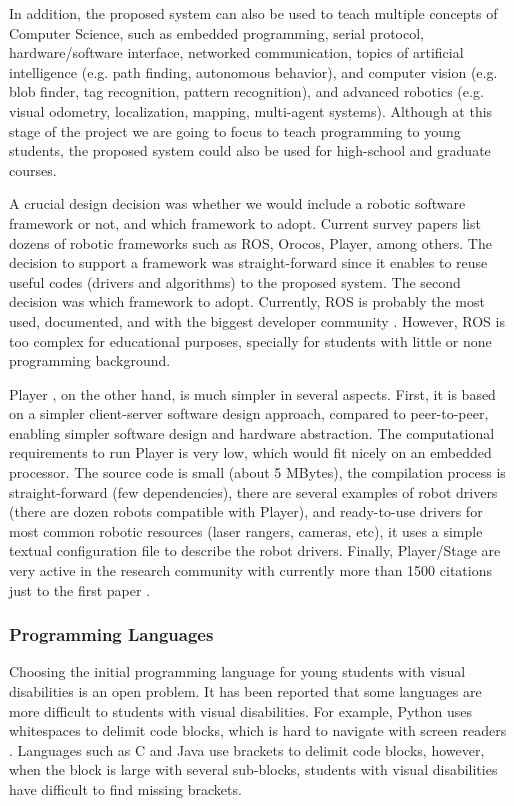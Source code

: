 In addition, the proposed system can also be used to teach multiple concepts of Computer Science, such as embedded programming, serial protocol, hardware/software interface, networked communication, topics of artificial intelligence (e.g. path finding, autonomous behavior), and computer vision (e.g. blob finder, tag recognition, pattern recognition), and advanced robotics (e.g. visual odometry, localization, mapping, multi-agent systems). Although at this stage of the project we are going to focus to teach programming to young students, the proposed system could also be used for high-school and graduate courses.

A crucial design decision was whether we would include a robotic software framework or not, and which framework to adopt. Current survey papers \cite{kramer2007,elkady2012} list dozens of robotic frameworks such as ROS, Orocos, Player, among others. The decision to support a framework was straight-forward since it enables to reuse useful codes (drivers and algorithms) to the proposed system. The second decision was which framework to adopt. Currently, ROS is probably the most used, documented, and with the biggest developer community \cite{quigley2009}. However, ROS is too complex for educational purposes, specially for students with little or none programming background. 

Player \cite{gerkey2003}, on the other hand, is much simpler in several aspects. First, it is based on a simpler client-server software design approach, compared to peer-to-peer, enabling simpler software design and hardware abstraction. The computational requirements to run Player is very low, which would fit nicely on an embedded processor. The source code is small (about 5 MBytes), the compilation process is straight-forward (few dependencies), there are several examples of robot drivers (there are dozen robots compatible with Player), and ready-to-use drivers for most common robotic resources (laser rangers, cameras, etc), it uses a simple textual configuration file to describe the robot drivers. Finally, Player/Stage are very active in the research community with currently more than 1500 citations just to the first paper \cite{gerkey2003}.

\subsubsection{Programming Languages}
\label{sec:prog-lang}

Choosing the initial programming language for young students with visual disabilities is an open problem. It has been reported that some languages are more difficult to students with visual disabilities. For example, Python uses whitespaces to delimit code blocks, which is hard to navigate with screen readers \cite{kane2014}. Languages such as C and Java use brackets to delimit code blocks, however, when the block is large with several sub-blocks, students with visual disabilities have difficult to find missing brackets.

